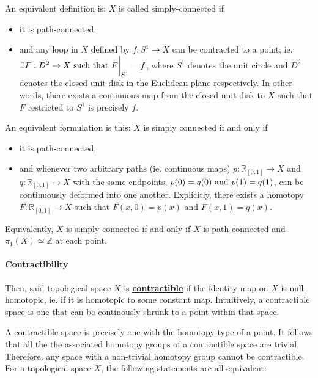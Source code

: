 \documentclass{homework}
\begin{document}
An equivalent definition is: $X$ is called simply-connected if

\begin{itemize}
    \item it is path-connected, 
    \item and any loop in $X$ defined by $f: S^{1} \to X$ can be contracted to a point; ie. $\exists F: D^{2} \to X \textnormal{ such that } F\bigg|_{S^{1}} = f$, where ${S^{1}}$ denotes the unit circle and $D^2$ denotes the closed unit disk in the Euclidean plane respectively. In other words, there exists a continuous map from the closed unit disk to $X$ such that $F$ restricted to $S^1$ is precisely $f$.
\end{itemize}

An equivalent formulation is this: $X$ is simply connected if and only if 

\begin{itemize}
    \item it is path-connected,
    \item and whenever two arbitrary paths (ie. continuous maps) $p: \mathds{R}_{[0,1]} \to X$ and $q: \mathds{R}_{[0,1]} \to X$ with the same endpoints, $p(0) = q(0) \textnormal{ and } p(1) = q(1)$, can be continuously deformed into one another. Explicitly, there exists a homotopy $F: \mathds{R}_{[0,1]} \to X$ such that $F(x,0) = p(x)$ and $F(x,1) = q(x)$. \\
\end{itemize}

Equivalently, $X$ is simply connected if and only if $X$ is path-connected and $\pi_1 (X) \simeq \mathds{Z}$ at each point. \\

\paragraph{\textbf{Contractibility}}

 Then, said topological space $X$ is \underline{\textbf{contractible}} if the identity map on $X$ is null-homotopic, ie. if it is homotopic to some constant map. Intuitively, a contractible space is one that can be continously shrunk to a point within that space.

A contractible space is precisely one with the homotopy type of a point. It follows that all the the associated homotopy groups of a contractible space are trivial. Therefore, any space with a non-trivial homotopy group cannot be contractible. For a topological space $X$, the following statements are all equivalent:
\end{document}
